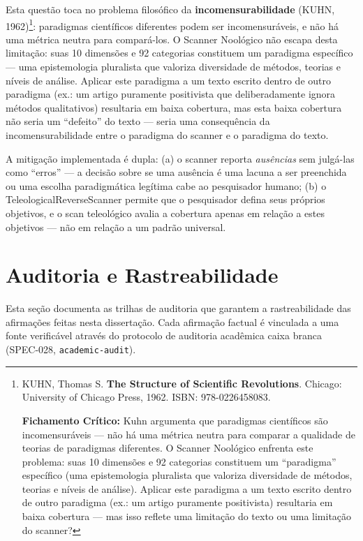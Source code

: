 Esta questão toca no problema filosófico da \textbf{incomensurabilidade} (KUHN, 1962)\footnote{
  KUHN, Thomas S. \textbf{The Structure of Scientific Revolutions}. Chicago: University of Chicago Press, 1962. ISBN: 978-0226458083.

  \textbf{Fichamento Crítico:} Kuhn argumenta que paradigmas científicos são incomensuráveis --- não há uma métrica neutra para comparar a qualidade de teorias de paradigmas diferentes. O Scanner Noológico enfrenta este problema: suas 10 dimensões e 92 categorias constituem um ``paradigma'' específico (uma epistemologia pluralista que valoriza diversidade de métodos, teorias e níveis de análise). Aplicar este paradigma a um texto escrito dentro de outro paradigma (ex.: um artigo puramente positivista) resultaria em baixa cobertura --- mas isso reflete uma limitação do texto ou uma limitação do scanner?
}: paradigmas científicos diferentes podem ser incomensuráveis, e não há uma métrica neutra para compará-los. O Scanner Noológico não escapa desta limitação: suas 10 dimensões e 92 categorias constituem um paradigma específico --- uma epistemologia pluralista que valoriza diversidade de métodos, teorias e níveis de análise. Aplicar este paradigma a um texto escrito dentro de outro paradigma (ex.: um artigo puramente positivista que deliberadamente ignora métodos qualitativos) resultaria em baixa cobertura, mas esta baixa cobertura não seria um ``defeito'' do texto --- seria uma consequência da incomensurabilidade entre o paradigma do scanner e o paradigma do texto.

A mitigação implementada é dupla: (a) o scanner reporta \textit{ausências} sem julgá-las como ``erros'' --- a decisão sobre se uma ausência é uma lacuna a ser preenchida ou uma escolha paradigmática legítima cabe ao pesquisador humano; (b) o TeleologicalReverseScanner permite que o pesquisador defina seus próprios objetivos, e o scan teleológico avalia a cobertura apenas em relação a estes objetivos --- não em relação a um padrão universal.

\section{Auditoria e Rastreabilidade}

Esta seção documenta as trilhas de auditoria que garantem a rastreabilidade das afirmações feitas nesta dissertação. Cada afirmação factual é vinculada a uma fonte verificável através do protocolo de auditoria acadêmica caixa branca (SPEC-028, \texttt{academic-audit}).

